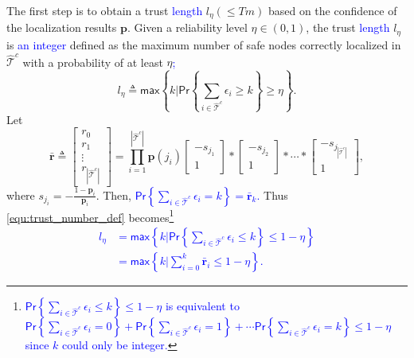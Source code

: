 \noindent The first step is to obtain a trust \textcolor{blue}{length} $l_{\eta}(\leq Tm)$ based on the confidence of the localization results $\mathbf{p}$.  Given a reliability level $\eta \in (0,1)$, the trust \textcolor{blue}{length} $l_{\eta}$ is \textcolor{blue}{an integer} defined as the maximum number of safe nodes correctly localized in $\hat{\mathcal{T}}^c$ with a probability of at least $\eta$\textcolor{blue}{;}
\begin{equation}\label{equ:trust_number_def}
    l_{\eta} \triangleq \textsf{max} \left\{k \biggl\lvert \textsf{Pr} \left\{\sum_{i\in \hat{\mathcal{T}}^c} \epsilon_i \geq k \right\}\geq \eta \right\}.
\end{equation}
Let
\begin{equation} \label{equ:r_tau_hat_c}
    \bar{\mathbf{r}} \triangleq \begin{bmatrix}r_{0} \\ r_{1} \\\vdots \\ r_{|\hat{\mathcal{T}}^c|}\end{bmatrix} = \displaystyle\prod_{i=1}^{|\hat{\mathcal{T}}^c|} \mathbf{p}(j_i)  \begin{bmatrix}-s_{j_1}\\1 \end{bmatrix} * \begin{bmatrix}-s_{j_2}\\1 \end{bmatrix} * \cdots * \begin{bmatrix}-s_{j_{|\hat{\mathcal{T}}^c|}}\\1 \end{bmatrix},
\end{equation}
where $s_{j_i} = -\frac{1-\mathbf{p}_i}{\mathbf{p}_i}$.
Then, \textcolor{blue}{$\displaystyle\textsf{Pr}\left\{\sum_{i\in\hat{\mathcal{T}}^c} \epsilon_i = k\right\} = \bar{\mathbf{r}}_k$.}
Thus \eqref{equ:trust_number_def} becomes\footnote{\textcolor{blue}{$\displaystyle\textsf{Pr}\left\{\sum_{i \in \hat{\mathcal{T}}^{c}} \epsilon_{i} \leq k\right\} \leq 1-\eta$ is equivalent to $\displaystyle\textsf{Pr}\left\{\sum_{i \in \hat{\mathcal{T}}^{c}} \epsilon_{i} = 0\right\} + \textsf{Pr}\left\{\sum_{i \in \hat{\mathcal{T}}^{c}} \epsilon_{i} = 1\right\} +\cdots \textsf{Pr}\left\{\sum_{i \in \hat{\mathcal{T}}^{c}} \epsilon_{i} = k\right\} \leq 1-\eta$ since $k$ could only be integer.}}
\textcolor{blue}{
\begin{equation}\label{equ:trust_number}
\begin{aligned}
l_{\eta}&= \textsf{max} \left\{k \biggl\lvert \textsf{Pr}\left\{\sum_{i \in \hat{\mathcal{T}}^{c}} \epsilon_{i} \leq k\right\} \leq 1-\eta\right\}  \\
&= \textsf{max} \left\{k \biggl\lvert \sum_{i=0}^{k} \bar{\mathbf{r}}_i \leq 1-\eta \right\}.
\end{aligned}
\end{equation}}


